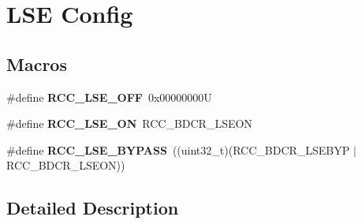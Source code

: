\hypertarget{group___r_c_c___l_s_e___config}{}\section{L\+SE Config}
\label{group___r_c_c___l_s_e___config}
\subsection*{Macros}
\begin{DoxyCompactItemize}
\item 
\mbox{\label{group___r_c_c___l_s_e___config_ga6645c27708d0cad1a4ab61d2abb24c77}} 
\#define {\bfseries R\+C\+C\+\_\+\+L\+S\+E\+\_\+\+O\+FF}~0x00000000U
\item 
\mbox{\label{group___r_c_c___l_s_e___config_gac981ea636c2f215e4473901e0912f55a}} 
\#define {\bfseries R\+C\+C\+\_\+\+L\+S\+E\+\_\+\+ON}~R\+C\+C\+\_\+\+B\+D\+C\+R\+\_\+\+L\+S\+E\+ON
\item 
\mbox{\label{group___r_c_c___l_s_e___config_gaad580157edbae878edbcc83c5a68e767}} 
\#define {\bfseries R\+C\+C\+\_\+\+L\+S\+E\+\_\+\+B\+Y\+P\+A\+SS}~((uint32\+\_\+t)(R\+C\+C\+\_\+\+B\+D\+C\+R\+\_\+\+L\+S\+E\+B\+YP $\vert$ R\+C\+C\+\_\+\+B\+D\+C\+R\+\_\+\+L\+S\+E\+ON))
\end{DoxyCompactItemize}


\subsection{Detailed Description}
